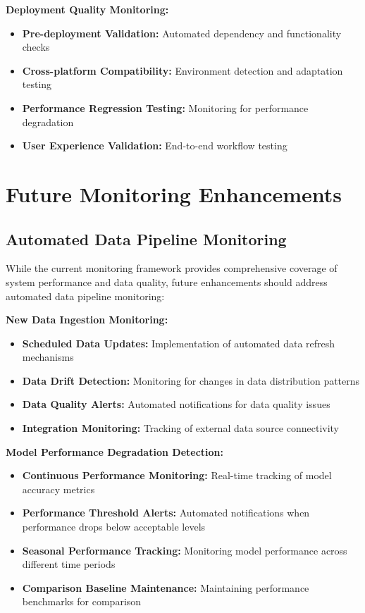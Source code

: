 \textbf{Deployment Quality Monitoring:}
\begin{itemize}
	\item \textbf{Pre-deployment Validation:} Automated dependency and functionality checks
	\item \textbf{Cross-platform Compatibility:} Environment detection and adaptation testing
	\item \textbf{Performance Regression Testing:} Monitoring for performance degradation
	\item \textbf{User Experience Validation:} End-to-end workflow testing
\end{itemize}

\section{Future Monitoring Enhancements}

\subsection{Automated Data Pipeline Monitoring}

While the current monitoring framework provides comprehensive coverage of system performance and data quality, future enhancements should address automated data pipeline monitoring:

\textbf{New Data Ingestion Monitoring:}
\begin{itemize}
	\item \textbf{Scheduled Data Updates:} Implementation of automated data refresh mechanisms
	\item \textbf{Data Drift Detection:} Monitoring for changes in data distribution patterns
	\item \textbf{Data Quality Alerts:} Automated notifications for data quality issues
	\item \textbf{Integration Monitoring:} Tracking of external data source connectivity
\end{itemize}

\textbf{Model Performance Degradation Detection:}
\begin{itemize}
	\item \textbf{Continuous Performance Monitoring:} Real-time tracking of model accuracy metrics
	\item \textbf{Performance Threshold Alerts:} Automated notifications when performance drops below acceptable levels
	\item \textbf{Seasonal Performance Tracking:} Monitoring model performance across different time periods
	\item \textbf{Comparison Baseline Maintenance:} Maintaining performance benchmarks for comparison
\end{itemize}

